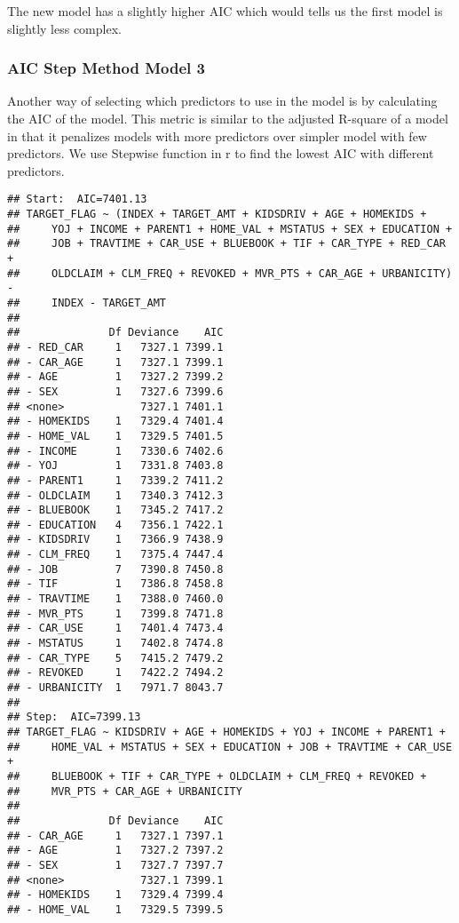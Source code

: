 \documentclass[]{article}
\begin{document}
The new model has a slightly higher AIC which would tells us the first
model is slightly less complex.

\hypertarget{aic-step-method-model-3}{%
\subsubsection{AIC Step Method Model 3}\label{aic-step-method-model-3}}

Another way of selecting which predictors to use in the model is by
calculating the AIC of the model. This metric is similar to the adjusted
R-square of a model in that it penalizes models with more predictors
over simpler model with few predictors. We use Stepwise function in r to
find the lowest AIC with different predictors.

\begin{verbatim}
## Start:  AIC=7401.13
## TARGET_FLAG ~ (INDEX + TARGET_AMT + KIDSDRIV + AGE + HOMEKIDS + 
##     YOJ + INCOME + PARENT1 + HOME_VAL + MSTATUS + SEX + EDUCATION + 
##     JOB + TRAVTIME + CAR_USE + BLUEBOOK + TIF + CAR_TYPE + RED_CAR + 
##     OLDCLAIM + CLM_FREQ + REVOKED + MVR_PTS + CAR_AGE + URBANICITY) - 
##     INDEX - TARGET_AMT
## 
##              Df Deviance    AIC
## - RED_CAR     1   7327.1 7399.1
## - CAR_AGE     1   7327.1 7399.1
## - AGE         1   7327.2 7399.2
## - SEX         1   7327.6 7399.6
## <none>            7327.1 7401.1
## - HOMEKIDS    1   7329.4 7401.4
## - HOME_VAL    1   7329.5 7401.5
## - INCOME      1   7330.6 7402.6
## - YOJ         1   7331.8 7403.8
## - PARENT1     1   7339.2 7411.2
## - OLDCLAIM    1   7340.3 7412.3
## - BLUEBOOK    1   7345.2 7417.2
## - EDUCATION   4   7356.1 7422.1
## - KIDSDRIV    1   7366.9 7438.9
## - CLM_FREQ    1   7375.4 7447.4
## - JOB         7   7390.8 7450.8
## - TIF         1   7386.8 7458.8
## - TRAVTIME    1   7388.0 7460.0
## - MVR_PTS     1   7399.8 7471.8
## - CAR_USE     1   7401.4 7473.4
## - MSTATUS     1   7402.8 7474.8
## - CAR_TYPE    5   7415.2 7479.2
## - REVOKED     1   7422.2 7494.2
## - URBANICITY  1   7971.7 8043.7
## 
## Step:  AIC=7399.13
## TARGET_FLAG ~ KIDSDRIV + AGE + HOMEKIDS + YOJ + INCOME + PARENT1 + 
##     HOME_VAL + MSTATUS + SEX + EDUCATION + JOB + TRAVTIME + CAR_USE + 
##     BLUEBOOK + TIF + CAR_TYPE + OLDCLAIM + CLM_FREQ + REVOKED + 
##     MVR_PTS + CAR_AGE + URBANICITY
## 
##              Df Deviance    AIC
## - CAR_AGE     1   7327.1 7397.1
## - AGE         1   7327.2 7397.2
## - SEX         1   7327.7 7397.7
## <none>            7327.1 7399.1
## - HOMEKIDS    1   7329.4 7399.4
## - HOME_VAL    1   7329.5 7399.5

\end{verbatim}
\end{document}
